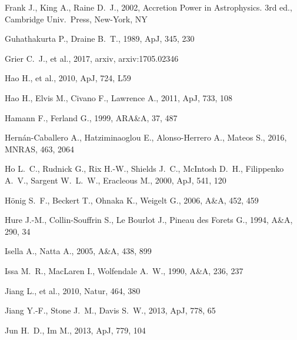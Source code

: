 \documentclass[a4paper,fleqn,usenatbib]{mnras}
\begin{document}
\begin{thebibliography}{99}
 Frank J., King A., Raine D.~J., 2002, Accretion Power in Astrophysics. 3rd ed., Cambridge Univ.\ Press, New-York, NY  

 Guhathakurta P., Draine B.~T., 1989, ApJ, 345, 230

 Grier C.~J., et al., 2017, arxiv, arxiv:1705.02346 
 
 Hao H., et al., 2010, ApJ, 724, L59 

 Hao H., Elvis M., Civano F., Lawrence A., 2011, ApJ, 733, 108
 
 Hamann F., Ferland G., 1999, ARA\&A, 37, 487 

 Hern{\'a}n-Caballero A., Hatziminaoglou E., Alonso-Herrero A., Mateos S., 2016, MNRAS, 463, 2064
 
 Ho L.~C., Rudnick G., Rix H.-W., Shields J.~C., McIntosh D.~H., Filippenko A.~V., Sargent W.~L.~W., Eracleous M., 2000, ApJ, 541, 120 

 H{\"o}nig S.~F., Beckert T., Ohnaka K., Weigelt G., 2006, A\&A, 452, 459 

 Hure J.-M., Collin-Souffrin S., Le Bourlot J., Pineau des Forets G., 1994, A\&A, 290, 34 

 Isella A., Natta A., 2005, A\&A, 438, 899 

 Issa M.~R., MacLaren I., Wolfendale A.~W., 1990, A\&A, 236, 237 

 Jiang L., et al., 2010, Natur, 464, 380
 
 Jiang Y.-F., Stone J.~M., Davis S.~W., 2013, ApJ, 778, 65 

 Jun H.~D., Im M., 2013, ApJ, 779, 104 


\end{thebibliography}
\end{document}
